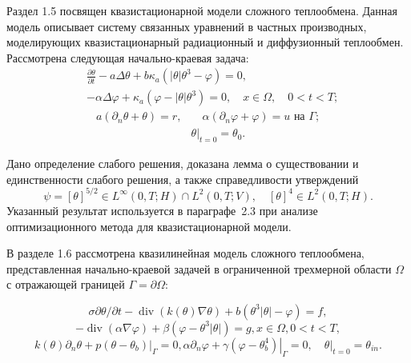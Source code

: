Раздел 1.5 посвящен квазистационарной модели сложного теплообмена.
Данная модель описывает систему связанных уравнений в частных производных,
моделирующих квазистационарный радиационный и диффузионный теплообмен.
Рассмотрена следующая начально-краевая задача:
\begin{equation}
    \label{eq:1_5:1}
    \begin{split}
        & \frac{\partial \theta}{\partial t} - a \Delta \theta
        + b \kappa_{a} \left(|\theta| \theta^{3}-\varphi\right) = 0,\\
        & - \alpha \Delta \varphi
        + \kappa_{a} \left(\varphi-|\theta| \theta^{3}\right) = 0,
        \quad x \in \Omega, \quad 0 < t < T;
    \end{split}
\end{equation}
\begin{align}
    a \left(\partial_{n} \theta+\theta\right)=r,
    & \quad \alpha\left(\partial_{n} \varphi
    + \varphi\right) = u \text { на } \Gamma;  \label{eq:1_5:2}\\
    & \left.\theta\right|_{t=0} = \theta_{0}. \label{eq:1_5:3}
\end{align}



Дано определение слабого решения, доказана лемма о существовании и единственности
слабого решения, а также справедливости утверждений
\[
    \psi=[\theta]^{5 / 2} \in L^{\infty}(0, T ; H) \cap L^{2}(0, T ; V),
    \quad[\theta]^{4} \in L^{2}(0, T ; H).
\]
Указанный результат используется в параграфе~2.3 при анализе
оптимизационного метода для квазистационарной модели.

В разделе 1.6 рассмотрена квазилинейная модель сложного теплообмена,
представленная начально-краевой задачей в ограниченной трехмерной
области $\Omega$ с отражающей границей $\Gamma=\partial \Omega$:

\begin{equation}
    \label{eq:1_6:1}
    \sigma \partial \theta / \partial t
    -\operatorname{div}(k(\theta) \nabla \theta)
    +b\left(\theta^{3}|\theta|-\varphi\right)=f,
\end{equation}
\begin{equation}
    \label{eq:1_6:2}
    -\operatorname{div}(\alpha \nabla \varphi)
    +\beta\left(\varphi-\theta^{3}|\theta|\right)=g, x \in \Omega, 0<t<T,
\end{equation}
\begin{equation}
    \label{eq:1_6:3}
    k(\theta) \partial_{n} \theta+\left.p\left(\theta-\theta_{b}\right)\right|_{\Gamma}=0,
    \alpha \partial_{n} \varphi
    +\left.\gamma\left(\varphi-\theta_{b}^{4}\right)\right|_{\Gamma}=0,
    \left.\quad \theta\right|_{t=0}=\theta_{in}.
\end{equation}



